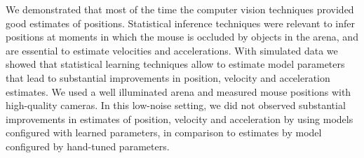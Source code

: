 
We demonstrated that most of the time the computer vision techniques provided
good estimates of positions. Statistical inference techniques were relevant
to infer positions at moments in which the mouse is occluded by objects in the
arena, and are essential to estimate velocities and accelerations. With
simulated data we showed that statistical learning techniques allow to estimate
model parameters that lead to substantial improvements in position, velocity
and acceleration estimates. We used a well illuminated arena and measured mouse
positions with high-quality cameras. In this low-noise setting, we did not
observed substantial improvements in estimates of position, velocity and
acceleration by using models configured with learned parameters, in comparison
to estimates by model configured by hand-tuned parameters.

